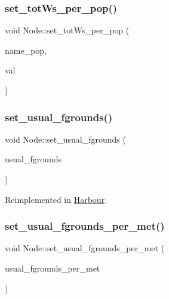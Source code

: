 \subsubsection{\texorpdfstring{set\_totWs\_per\_pop()}{set\_totWs\_per\_pop()}}
{\footnotesize\ttfamily void Node\+::set\+\_\+tot\+Ws\+\_\+per\+\_\+pop (\begin{DoxyParamCaption}\item[{int}]{name\+\_\+pop,  }\item[{double}]{val }\end{DoxyParamCaption})}

\mbox{\label{class_node_af8df7f4ea7508b5fc9188af822ba363d}} 
\subsubsection{\texorpdfstring{set\_usual\_fgrounds()}{set\_usual\_fgrounds()}}
{\footnotesize\ttfamily void Node\+::set\+\_\+usual\+\_\+fgrounds (\begin{DoxyParamCaption}\item[{const vector$<$ \mbox{\hyperlink{classtypes_1_1_node_id}{types\+::\+Node\+Id}} $>$ \&}]{usual\+\_\+fgrounds }\end{DoxyParamCaption})\hspace{0.3cm}{\ttfamily [virtual]}}



Reimplemented in \mbox{\hyperlink{class_harbour_a00ab27f3f0044f640da591821c735310}{Harbour}}.

\mbox{\label{class_node_ac9a4b300de4e64d3f4188ce543e80fbe}} 
\subsubsection{\texorpdfstring{set\_usual\_fgrounds\_per\_met()}{set\_usual\_fgrounds\_per\_met()}}
{\footnotesize\ttfamily void Node\+::set\+\_\+usual\+\_\+fgrounds\+\_\+per\+\_\+met (\begin{DoxyParamCaption}\item[{multimap$<$ int, \mbox{\hyperlink{classtypes_1_1_node_id}{types\+::\+Node\+Id}} $>$}]{usual\+\_\+fgrounds\+\_\+per\+\_\+met }\end{DoxyParamCaption})\hspace{0.3cm}{\ttfamily [virtual]}}



